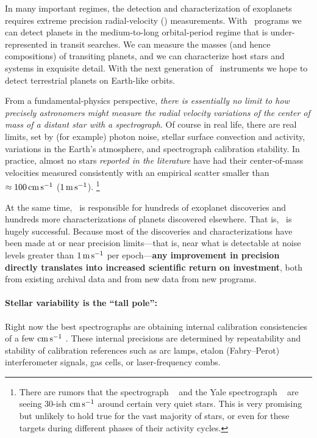 \documentclass[12pt, letterpaper]{article}
\begin{document}
\sloppy\sloppypar\raggedbottom\frenchspacing

\noindent
In many important regimes, the detection and characterization of exoplanets
requires extreme precision radial-velocity (\EPRV)
measurements.
With \EPRV\ programs we can detect planets in the medium-to-long 
orbital-period regime that is under-represented in transit searches.
We can measure the 
masses (and hence compositions) of transiting planets,
and we can characterize host stars and systems in exquisite detail.
With the next generation of \EPRV\ 
instruments
we hope to detect terrestrial planets on Earth-like orbits.

From a fundamental-physics perspective, \emph{there is essentially no limit to how
precisely astronomers might measure the radial velocity variations
of the center of mass of a distant star with a spectrograph}.
Of course in real life, there are real limits, set
by (for example) photon noise, stellar surface convection and activity,
variations in the Earth's atmosphere, and spectrograph calibration stability.
In practice, almost no stars \emph{reported in the literature}
have had their center-of-mass
velocities measured consistently with an empirical scatter
smaller than $\approx 100\,{\mathrm{cm\,s^{-1}}}$ 
($1\,{\mathrm{m\,s^{-1}}}$). 
\footnote{There are rumors that the  spectrograph
  \ESPRESSO\ \citep{Pepe2010} and the Yale spectrograph \EXPRES\ 
  \citep{Jurgenson2016} are seeing 
  30-ish ${\mathrm{cm\,s^{-1}}}$ around certain very quiet stars.
This is very promising but unlikely to hold true for the vast majority of stars, or even for these targets during different phases of their activity cycles.}

At the same time, \EPRV\ is responsible for hundreds of  exoplanet discoveries and hundreds more \foreign{a
posteriori} characterizations of planets discovered elsewhere.
That is, \EPRV\ is hugely successful.
Because most of the discoveries and characterizations have been made
at or near precision limits---that is, near what is detectable at noise levels
greater than $1\,{\mathrm{m\,s^{-1}}}$ per epoch---\textbf{any improvement in precision directly
translates into increased scientific return on investment},
both from existing archival data and from new data from new programs.

\paragraph{Stellar variability is the ``tall pole'':}
Right now the best spectrographs are obtaining internal calibration
consistencies of a few ${\mathrm{cm\,s^{-1}}}$ \citep{espresso-eprv4, expres-eprv4}.
These internal precisions are determined by repeatability and
stability of calibration references such as arc lamps, etalon
(Fabry--Perot) interferometer signals, gas cells, or laser-frequency
combs.
\end{document}

